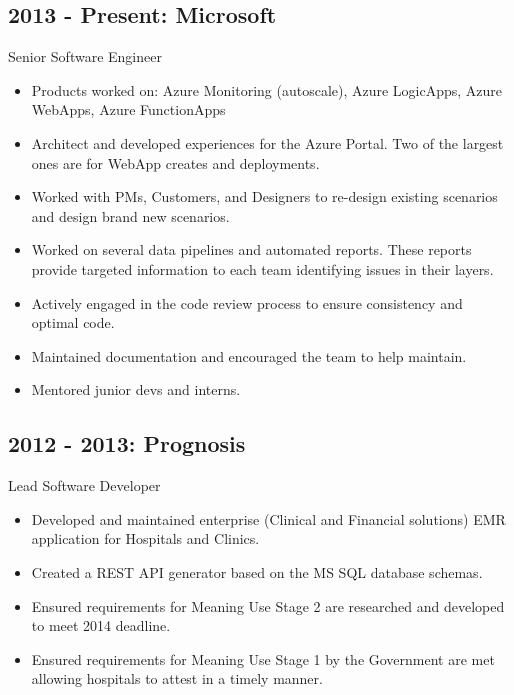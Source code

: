 \documentclass[11pt]{article}
\begin{document}
        \subsection*{2013 - Present: Microsoft}
            Senior Software Engineer
            \begin{itemize}
                \item Products worked on: Azure Monitoring (autoscale), Azure LogicApps, Azure WebApps, Azure FunctionApps
                \item Architect and developed experiences for the Azure Portal. Two of the largest ones are for WebApp creates and deployments.
                \item Worked with PMs, Customers, and Designers to re-design existing scenarios and design brand new scenarios. 
                \item Worked on several data pipelines and automated reports. These reports provide targeted information to each team identifying issues in their layers. 
                \item Actively engaged in the code review process to ensure consistency and optimal code.
                \item Maintained documentation and encouraged the team to help maintain.
                \item Mentored junior devs and interns.
            \end{itemize}

        \subsection*{2012 - 2013: Prognosis}
            Lead Software Developer
            \begin{itemize}
                \item Developed and maintained enterprise (Clinical and Financial solutions) EMR application for Hospitals and Clinics.
                \item Created a REST API generator based on the MS SQL database schemas.
                \item Ensured requirements for Meaning Use Stage 2 are researched and developed to meet 2014 deadline.
                \item Ensured requirements for Meaning Use Stage 1 by the Government are met allowing hospitals to attest in a timely manner.
            \end{itemize}
\end{document}
